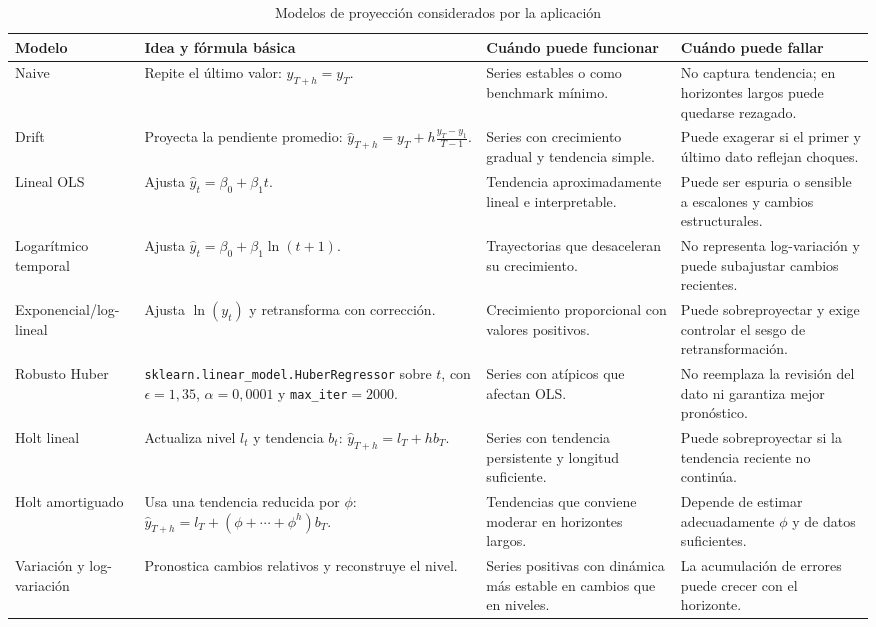 \documentclass[12pt,letterpaper]{article}
\begin{document}
\begin{table}[H]
\centering
\caption{Modelos de proyección considerados por la aplicación}
\label{tab:modelos_proyeccion_detalle}
\vspace{\baselineskip}
\scriptsize
\begin{tabularx}{\textwidth}{@{}>{\raggedright\arraybackslash}p{2.6cm}YYY@{}}
\toprule
\textbf{Modelo} & \textbf{Idea y fórmula básica} & \textbf{Cuándo puede funcionar} & \textbf{Cuándo puede fallar} \\
\midrule
Naive & Repite el último valor: \(\hat{y}_{T+h}=y_T\). & Series estables o como benchmark mínimo. & No captura tendencia; en horizontes largos puede quedarse rezagado. \\
Drift & Proyecta la pendiente promedio: \(\hat{y}_{T+h}=y_T+h\frac{y_T-y_1}{T-1}\). & Series con crecimiento gradual y tendencia simple. & Puede exagerar si el primer y último dato reflejan choques. \\
Lineal OLS & Ajusta \(\hat{y}_t=\beta_0+\beta_1t\). & Tendencia aproximadamente lineal e interpretable. & Puede ser espuria o sensible a escalones y cambios estructurales. \\
Logarítmico temporal & Ajusta \(\hat{y}_t=\beta_0+\beta_1\ln(t+1)\). & Trayectorias que desaceleran su crecimiento. & No representa log-variación y puede subajustar cambios recientes. \\
Exponencial/log-lineal & Ajusta \(\ln(y_t)\) y retransforma con corrección. & Crecimiento proporcional con valores positivos. & Puede sobreproyectar y exige controlar el sesgo de retransformación. \\
Robusto Huber & \texttt{sklearn.\allowbreak linear\_model.\allowbreak HuberRegressor} sobre \(t\), con \(\epsilon=1{,}35\), \(\alpha=0{,}0001\) y \texttt{max\_iter}\(=2000\). & Series con atípicos que afectan OLS. & No reemplaza la revisión del dato ni garantiza mejor pronóstico. \\
Holt lineal & Actualiza nivel \(l_t\) y tendencia \(b_t\): \(\hat{y}_{T+h}=l_T+hb_T\). & Series con tendencia persistente y longitud suficiente. & Puede sobreproyectar si la tendencia reciente no continúa. \\
Holt amortiguado & Usa una tendencia reducida por \(\phi\): \(\hat{y}_{T+h}=l_T+(\phi+\cdots+\phi^h)b_T\). & Tendencias que conviene moderar en horizontes largos. & Depende de estimar adecuadamente \(\phi\) y de datos suficientes. \\
Variación y log-\allowbreak variación & Pronostica cambios relativos y reconstruye el nivel. & Series positivas con dinámica más estable en cambios que en niveles. & La acumulación de errores puede crecer con el horizonte. \\
\bottomrule
\end{tabularx}
\end{table}
\end{document}
